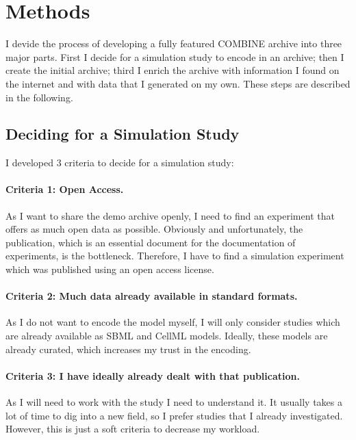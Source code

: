 
\section{Methods}

I devide the process of developing a fully featured COMBINE archive into three major parts.
First I decide for a simulation study to encode in an archive; then I create the initial archive; third I enrich the archive with information I found on the internet and with data that I generated on my own.
These steps are described in the following.

\subsection{Deciding for a Simulation Study}

I developed 3 criteria to decide for a simulation study:

\paragraph{Criteria 1: Open Access.}
As I want to share the demo archive openly, I need to find an experiment that offers as much open data as possible.
Obviously and unfortunately, the publication, which is an essential document for the documentation of experiments, is the bottleneck.
  Therefore, I have to find a simulation experiment which was published using an open access license.


\paragraph{Criteria 2: Much data already available in standard formats.}
As I do not want to encode the model myself, I will only consider studies which are already available as SBML and CellML models.
Ideally, these models are already curated, which increases my trust in the encoding. 

\paragraph{Criteria 3: I have ideally already dealt with that publication.}
As I will need to work with the study I need to understand it.
It usually takes a lot of time to dig into a new field, so I prefer studies that I already investigated.
However, this is just a soft criteria to decrease my workload.


